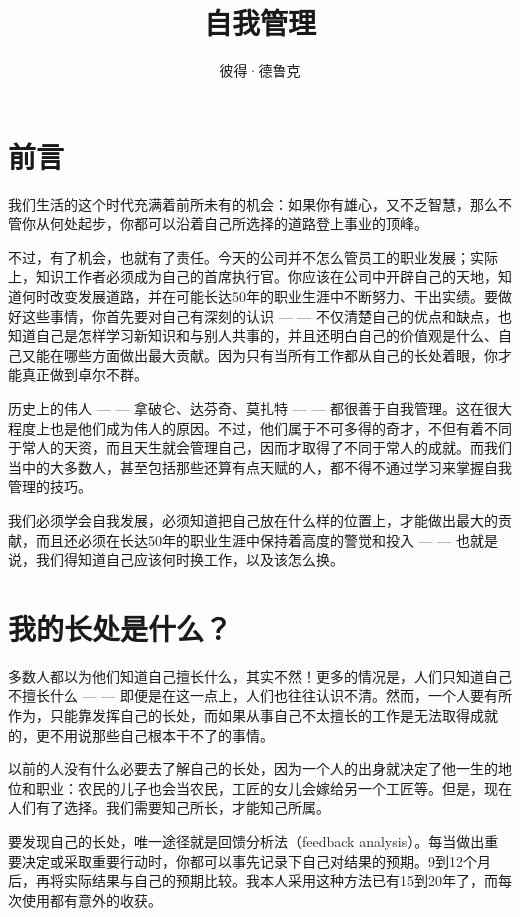 \documentclass[a4paper,12pt,lang=cn,fontset = windows]{elegantpaper} %
\title{自我管理} %
\author{彼得·德鲁克}
\date{}
\begin{document}
\maketitle
\section{前言}

我们生活的这个时代充满着前所未有的机会：如果你有雄心，又不乏智慧，那么不管你从何处起步，你都可以沿着自己所选择的道路登上事业的顶峰。

不过，有了机会，也就有了责任。今天的公司并不怎么管员工的职业发展；实际上，知识工作者必须成为自己的首席执行官。你应该在公司中开辟自己的天地，知道何时改变发展道路，并在可能长达50年的职业生涯中不断努力、干出实绩。要做好这些事情，你首先要对自己有深刻的认识 — — 不仅清楚自己的优点和缺点，也知道自己是怎样学习新知识和与别人共事的，并且还明白自己的价值观是什么、自己又能在哪些方面做出最大贡献。因为只有当所有工作都从自己的长处着眼，你才能真正做到卓尔不群。

历史上的伟人 — — 拿破仑、达芬奇、莫扎特 — — 都很善于自我管理。这在很大程度上也是他们成为伟人的原因。不过，他们属于不可多得的奇才，不但有着不同于常人的天资，而且天生就会管理自己，因而才取得了不同于常人的成就。而我们当中的大多数人，甚至包括那些还算有点天赋的人，都不得不通过学习来掌握自我管理的技巧。

我们必须学会自我发展，必须知道把自己放在什么样的位置上，才能做出最大的贡献，而且还必须在长达50年的职业生涯中保持着高度的警觉和投入 — — 也就是说，我们得知道自己应该何时换工作，以及该怎么换。

\section{我的长处是什么？}
多数人都以为他们知道自己擅长什么，其实不然！更多的情况是，人们只知道自己不擅长什么 — — 即便是在这一点上，人们也往往认识不清。然而，一个人要有所作为，只能靠发挥自己的长处，而如果从事自己不太擅长的工作是无法取得成就的，更不用说那些自己根本干不了的事情。

以前的人没有什么必要去了解自己的长处，因为一个人的出身就决定了他一生的地位和职业：农民的儿子也会当农民，工匠的女儿会嫁给另一个工匠等。但是，现在人们有了选择。我们需要知己所长，才能知己所属。

要发现自己的长处，唯一途径就是回馈分析法（feedback analysis）。每当做出重要决定或采取重要行动时，你都可以事先记录下自己对结果的预期。9到12个月后，再将实际结果与自己的预期比较。我本人采用这种方法已有15到20年了，而每次使用都有意外的收获。
\end{document}
